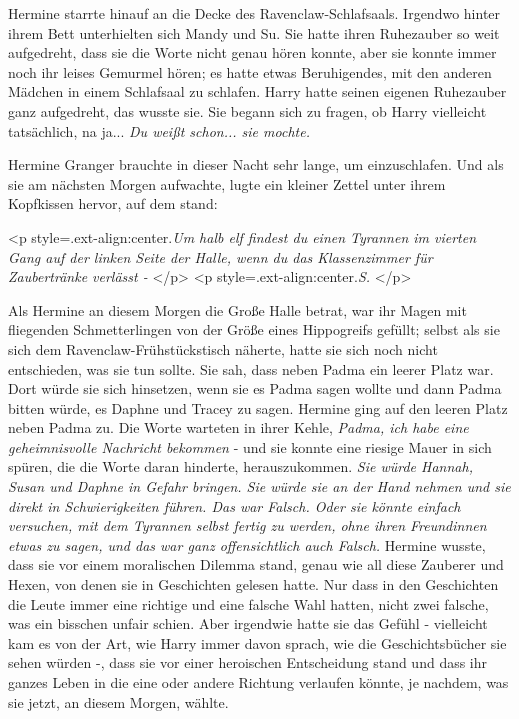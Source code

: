 Hermine starrte hinauf an die Decke des Ravenclaw-Schlafsaals. Irgendwo hinter
ihrem Bett unterhielten sich Mandy und Su. Sie hatte ihren Ruhezauber so weit
aufgedreht, dass sie die Worte nicht genau hören konnte, aber sie konnte immer
noch ihr leises Gemurmel hören; es hatte etwas Beruhigendes, mit den anderen
Mädchen in einem Schlafsaal zu schlafen. Harry hatte seinen eigenen Ruhezauber
ganz aufgedreht, das wusste sie. Sie begann sich zu fragen, ob Harry vielleicht
tatsächlich, na ja... \emph{Du weißt schon... sie mochte. }

Hermine Granger brauchte in dieser Nacht sehr lange, um einzuschlafen. Und als
sie am nächsten Morgen aufwachte, lugte ein kleiner Zettel unter ihrem
Kopfkissen hervor, auf dem stand:

<p style=\grqq{}.ext-align:center\grqq{}.\emph{\glqq Um halb elf findest du
einen Tyrannen im vierten Gang auf der linken Seite der Halle, wenn du das
Klassenzimmer für Zaubertränke verlässt - }</p> <p
style=\grqq{}.ext-align:center\grqq{}.\emph{S.\grqq{} }</p>

Als Hermine an diesem Morgen die Große Halle betrat, war ihr Magen mit
fliegenden Schmetterlingen von der Größe eines Hippogreifs gefüllt; selbst als
sie sich dem Ravenclaw-Frühstückstisch näherte, hatte sie sich noch nicht
entschieden, was sie tun sollte. Sie sah, dass neben Padma ein leerer Platz war.
Dort würde sie sich hinsetzen, wenn sie es Padma sagen wollte und dann Padma
bitten würde, es Daphne und Tracey zu sagen. Hermine ging auf den leeren Platz
neben Padma zu. Die Worte warteten in ihrer Kehle, \emph{Padma, ich habe eine
geheimnisvolle Nachricht bekommen} - und sie konnte eine riesige Mauer in sich
spüren, die die Worte daran hinderte, herauszukommen. \emph{Sie würde Hannah,
Susan und Daphne in Gefahr bringen. Sie würde sie an der Hand nehmen und sie
direkt in Schwierigkeiten führen. Das war Falsch. Oder sie könnte einfach
versuchen, mit dem Tyrannen selbst fertig zu werden, ohne ihren Freundinnen
etwas zu sagen, und das war ganz offensichtlich auch Falsch.} Hermine wusste,
dass sie vor einem moralischen Dilemma stand, genau wie all diese Zauberer und
Hexen, von denen sie in Geschichten gelesen hatte. Nur dass in den Geschichten
die Leute immer eine richtige und eine falsche Wahl hatten, nicht zwei falsche,
was ein bisschen unfair schien. Aber irgendwie hatte sie das Gefühl - vielleicht
kam es von der Art, wie Harry immer davon sprach, wie die Geschichtsbücher sie
sehen würden -, dass sie vor einer heroischen Entscheidung stand und dass ihr
ganzes Leben in die eine oder andere Richtung verlaufen könnte, je nachdem, was
sie jetzt, an diesem Morgen, wählte.

